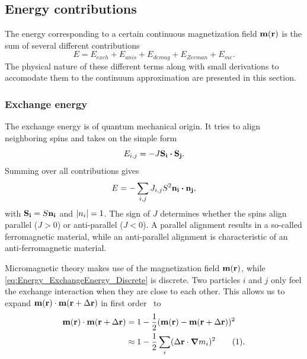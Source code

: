 \documentclass[12pt,a4paper]{article}
\newcommand{\numberthis}{\addtocounter{equation}{1}\tag{\theequation}}
\begin{document}
\subsection{Energy contributions}
The energy corresponding to a certain continuous magnetization field $\vb{m}(\vb{r})$ is the sum of several different contributions
\begin{equation}
    E = E_{exch} + E_{anis} + E_{demag} + E_{Zeeman} + E_{me} \mathrm{.} \label{eq:Energy_Terms}
\end{equation}
The physical nature of these different terms along with small derivations to accomodate them to the continuum approximation are presented in this section.
\subsubsection{Exchange energy}
\label{par:Energy_Exchange}
The exchange energy is of quantum mechanical origin. It tries to align neighboring spins and takes on the simple form
\begin{equation}
    E_{i,j} = -J \vb{S_i} \vdot \vb{S_j} \mathrm{.}
    \label{eq:Energy_ExchangeEnergy_Discrete}
\end{equation}
Summing over all contributions gives
\begin{equation}
    E = -\sum_{i,j} J_{i,j} S^2 \vb{n_i} \vdot \vb{n_j} \mathrm{,}
    \label{eq:Energy_ExchangeEnergy_SumDiscrete}
\end{equation}
with $\vb{S_i} = S \vb{n_i}$ and $\abs{n_i} = 1$. 
The sign of $J$ determines whether the spins align parallel ($J>0$) or anti-parallel ($J<0$). A parallel alignment results in a so-called ferromagnetic material, while an anti-parallel alignment is characteristic of an anti-ferromagnetic material. \par
Micromagnetic theory makes use of the magnetization field $\vb{m}(\vb{r})$, while \cref{eq:Energy_ExchangeEnergy_Discrete} is discrete. Two particles $i$ and $j$ only feel the exchange interaction when they are close to each other. This allows us to expand $\vb{m}(\vb{r}) \cdot \vb{m}(\vb{r} + \Delta\vb{r})$ in first order~\cite{abert2013discrete} to
\begin{align*}
    \vb{m}(\vb{r}) \cdot \vb{m}(\vb{r} + \Delta\vb{r}) &= 1 - \frac{1}{2}(\vb{m}(\vb{r}) - \vb{m}(\vb{r} + \Delta\vb{r}))^2 \\
    &\approx 1 - \frac{1}{2}\sum_i(\Delta\vb{r} \cdot \gradient{m_i})^2 \numberthis \label{eq:Energy_ExchangeEnergy_DotApprox} \mathrm{.}
\end{align*}
\end{document}
